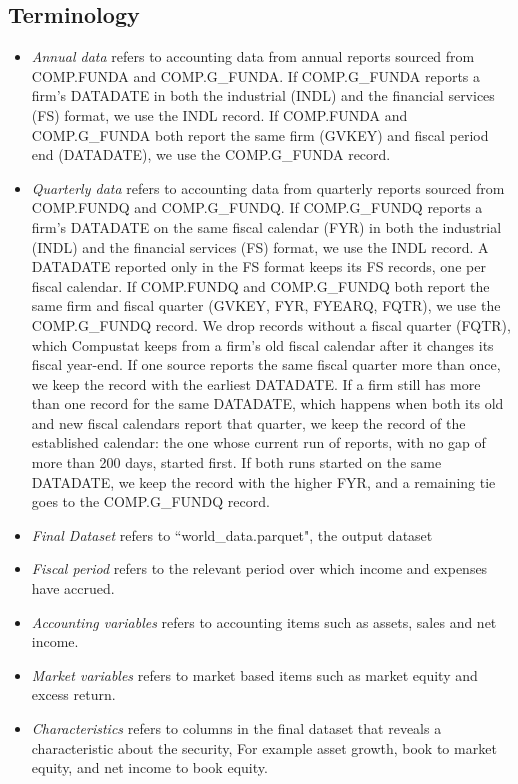 \documentclass[12pt,title,fleqn]{article}
\begin{document}
\subsection{Terminology}
\begin{itemize}
	\item \textit{Annual data} refers to accounting data from annual reports sourced from COMP.FUNDA and COMP.G\_FUNDA. If COMP.G\_FUNDA reports a firm's DATADATE in both the industrial (INDL) and the financial services (FS) format, we use the INDL record. If COMP.FUNDA and COMP.G\_FUNDA both report the same firm (GVKEY) and fiscal period end (DATADATE), we use the COMP.G\_FUNDA record.
	
	\item \textit{Quarterly data} refers to accounting data from quarterly reports sourced from COMP.FUNDQ and COMP.G\_FUNDQ. If COMP.G\_FUNDQ reports a firm's DATADATE on the same fiscal calendar (FYR) in both the industrial (INDL) and the financial services (FS) format, we use the INDL record. A DATADATE reported only in the FS format keeps its FS records, one per fiscal calendar. If COMP.FUNDQ and COMP.G\_FUNDQ both report the same firm and fiscal quarter (GVKEY, FYR, FYEARQ, FQTR), we use the COMP.G\_FUNDQ record. We drop records without a fiscal quarter (FQTR), which Compustat keeps from a firm's old fiscal calendar after it changes its fiscal year-end. If one source reports the same fiscal quarter more than once, we keep the record with the earliest DATADATE. If a firm still has more than one record for the same DATADATE, which happens when both its old and new fiscal calendars report that quarter, we keep the record of the established calendar: the one whose current run of reports, with no gap of more than 200 days, started first. If both runs started on the same DATADATE, we keep the record with the higher FYR, and a remaining tie goes to the COMP.G\_FUNDQ record.
	
	\item \textit{Final Dataset} refers to ``world\_data.parquet", the output dataset
	
	\item \textit{Fiscal period} refers to the relevant period over which income and expenses have accrued. 
	
	\item \textit{Accounting variables} refers to accounting items such as assets, sales and net income. 
	
	\item \textit{Market variables} refers to market based items such as market equity and excess return.
	
	\item \textit{Characteristics} refers to columns in the final dataset that reveals a characteristic about the security, For example asset growth, book to market equity, and net income to book equity. 
\end{itemize}
\end{document}
